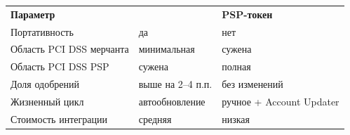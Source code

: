 \begingroup
\renewcommand{\arraystretch}{1.22}
\begin{tabularx}{\textwidth}{
    >{\raggedright\arraybackslash}p{}
    Y
    Y
  }
  \textbf{Параметр}
  &
  \textbf{} &
  \textbf{PSP-токен}
  \\
  Портативность
  & да                & нет                      \\
  Область PCI DSS мерчанта
  & минимальная       & сужена                   \\
  Область PCI DSS PSP
  & сужена            & полная                   \\
  Доля одобрений
  & выше на 2--4 п.п. & без изменений            \\
  Жизненный цикл
  & автообновление    & ручное + Account Updater \\
  Стоимость интеграции
  & средняя           & низкая                   \\
\end{tabularx}
\endgroup
